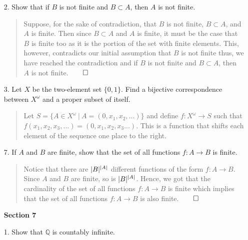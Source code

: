 \documentclass[12pt, a4paper]{article}
\newcommand{\rats}{\mathbb{Q}} %
\DeclarePairedDelimiter\abs{\lvert}{\rvert}
\newcommand{\rarr}{\rightarrow}
\begin{document}
\begin{itemize}
\item[2.]
Show that if $B$ is not finite and $B \subset A$, then $A$ is not finite.
\begin{quote}
Suppose, for the sake of contradiction, that $B$ is not finite, $B \subset A$, and $A$ is finite.
Then since $B \subset A$ and $A$ is finite, it must be the case that $B$ is finite too as it is
the portion of the set with finite elements. This, however, contradicts our initial assumption that $B$
is not finite thus, we have reached the contradiction and if $B$ is not finite and $B \subset A$, then $A$
is not finite.$\qed$
\end{quote}

\item[]

\item[3.]
Let $X$ be the two-element set $\{0, 1\}$. Find a bijective correspondence between $X^\omega$ and a proper
subset of itself.
\begin{quote}
Let $S = \{A \in X^\omega \ | \ A = (0, x_1, x_2, ...)\}$ and define $f : X^\omega \rarr S$ such that $f(x_1, x_2, x_3, ...) = (0, x_1, x_2, x_3 ...)$.
This is a function that shifts each element of the sequence one place to the right.
\end{quote}

\item[]

\item[7.]
If $A$ and $B$ are finite, show that the set of all functions $f : A \rarr B$ is finite.
\begin{quote}
Notice that there are $\abs{B}^{\abs{A}}$ different functions of the form $f : A \rarr B$.
Since $A$ and $B$ are finite, so is $\abs{B}^{\abs{A}}$. Hence, we got that the cardinality
of the set of all functions $f : A \rarr B$ is finite which implies that the set of all functions
$f : A \rarr B$ is also finite.$\qed$
\end{quote}

\item[]
\item[]
\item[]

{\large \textbf{Section 7}}
\vspace{0.3cm}

\item[1.]
Show that $\rats$ is countably infinite.


\end{itemize}
\end{document}
